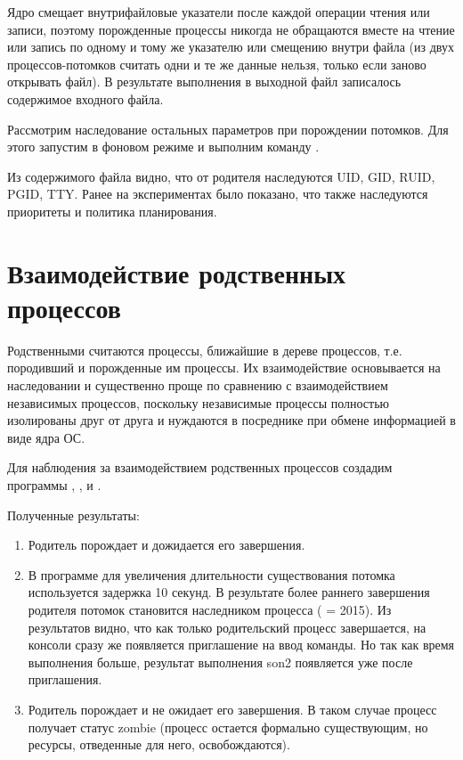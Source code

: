 Ядро смещает внутрифайловые указатели после каждой операции чтения или записи, поэтому порожденные процессы никогда не обращаются вместе на чтение или запись по одному и тому же указателю или смещению внутри файла (из двух процессов-потомков считать одни и те же данные нельзя, только если заново открывать файл). В результате выполнения в выходной файл записалось содержимое входного файла.

Рассмотрим наследование остальных параметров при порождении потомков. Для этого запустим  в фоновом режиме и выполним команду .



Из содержимого файла  видно, что от родителя наследуются UID, GID, RUID, PGID, TTY. Ранее на экспериментах было показано, что также наследуются приоритеты и политика планирования.

\section{Взаимодействие родственных процессов}

Родственными считаются процессы, ближайшие в дереве процессов, т.е. породивший и порожденные им процессы. Их взаимодействие основывается на наследовании и существенно проще по сравнению с взаимодействием независимых процессов, поскольку независимые процессы полностью изолированы друг от друга и нуждаются в посреднике при обмене информацией в виде ядра ОС. 

Для наблюдения за взаимодействием родственных процессов создадим программы , ,  и .









Полученные результаты:
\begin{enumerate}
	\item Родитель порождает  и дожидается его завершения. 
	\item В программе  для увеличения длительности существования потомка используется задержка 10 секунд. В результате более раннего завершения родителя потомок становится наследником процесса  ( = 2015). Из результатов видно, что как только родительский процесс завершается, на консоли сразу же появляется приглашение на ввод команды. Но так как время выполнения  больше, результат выполнения son2 появляется уже после приглашения.
	\item Родитель порождает  и не ожидает его завершения. В таком случае процесс получает статус zombie (процесс остается формально существующим, но ресурсы, отведенные для него, освобождаются).
\end{enumerate}

